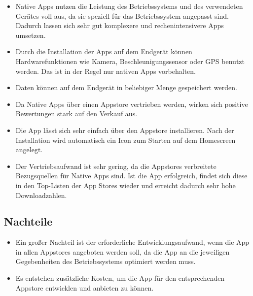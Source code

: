 \begin{itemize}

	\item Native Apps nutzen die Leistung des Betriebssystems und des verwendeten Gerätes voll aus, da sie speziell für das Betriebssystem angepasst sind. Dadurch lassen sich sehr gut komplexere und rechenintensivere Apps umsetzen.

	\item Durch die Installation der Apps auf dem Endgerät können Hardwarefunktionen wie Kamera, Beschleunigungssensor oder \ac{GPS} benutzt werden. Das ist in der Regel nur nativen Apps vorbehalten.

	\item Daten können auf dem Endgerät in beliebiger Menge gespeichert werden.

	\item Da Native Apps über einen Appstore vertrieben werden, wirken sich positive Bewertungen stark auf den Verkauf aus.

	\item Die App lässt sich sehr einfach über den Appstore installieren. Nach der Installation wird automatisch ein Icon zum Starten auf dem Homescreen angelegt.

	\item Der Vertriebsaufwand ist sehr gering, da die Appstores verbreitete Bezugsquellen für Native Apps sind. Ist die App erfolgreich, findet sich diese in den Top-Listen der App Stores wieder und erreicht dadurch sehr hohe Downloadzahlen.

\end{itemize}

\subsection{Nachteile}
\label{sec:native:cons}

\begin{itemize}

	\item Ein großer Nachteil ist der erforderliche Entwicklungsaufwand, wenn die App in allen Appstores angeboten werden soll, da die App an die jeweiligen Gegebenheiten des Betriebssystems optimiert werden muss.

	\item Es entstehen zusätzliche Kosten, um die App für den entsprechenden Appstore entwicklen und anbieten zu können.

\end{itemize}

